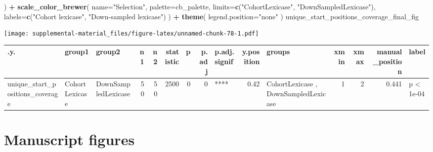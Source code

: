 \documentclass[]{book}
\newenvironment{Shaded}{\begin{snugshade}}{\end{snugshade}}
\newcommand{\DataTypeTok}[1]{\textcolor[rgb]{0.13,0.29,0.53}{#1}}
\newcommand{\KeywordTok}[1]{\textcolor[rgb]{0.13,0.29,0.53}{\textbf{#1}}}
\newcommand{\NormalTok}[1]{#1}
\newcommand{\OperatorTok}[1]{\textcolor[rgb]{0.81,0.36,0.00}{\textbf{#1}}}
\newcommand{\StringTok}[1]{\textcolor[rgb]{0.31,0.60,0.02}{#1}}
\begin{document}
\begin{Shaded}
\begin{Highlighting}[]
\NormalTok{  ) }\OperatorTok{+}
\StringTok{  }\KeywordTok{scale_color_brewer}\NormalTok{(}
    \DataTypeTok{name=}\StringTok{"Selection"}\NormalTok{,}
    \DataTypeTok{palette=}\NormalTok{cb_palette,}
    \DataTypeTok{limits=}\KeywordTok{c}\NormalTok{(}\StringTok{"CohortLexicase"}\NormalTok{, }\StringTok{"DownSampledLexicase"}\NormalTok{),}
    \DataTypeTok{labels=}\KeywordTok{c}\NormalTok{(}\StringTok{"Cohort lexicase"}\NormalTok{, }\StringTok{"Down-sampled lexicase"}\NormalTok{)}
\NormalTok{  ) }\OperatorTok{+}
\StringTok{  }\KeywordTok{theme}\NormalTok{(}
    \DataTypeTok{legend.position=}\StringTok{"none"}
\NormalTok{  )}
\NormalTok{unique_start_positions_coverage_final_fig}
\end{Highlighting}
\end{Shaded}

\texttt{[image: supplemental-material\_files/figure-latex/unnamed-chunk-78-1.pdf]}

\begin{tabular}{l|l|l|r|r|r|r|r|l|r|l|r|r|r|l}
\hline
.y. & group1 & group2 & n1 & n2 & statistic & p & p.adj & p.adj.signif & y.position & groups & xmin & xmax & manual\_position & label\\
\hline
unique\_start\_positions\_coverage & CohortLexicase & DownSampledLexicase & 50 & 50 & 2500 & 0 & 0 & **** & 0.42 & CohortLexicase     , DownSampledLexicase & 1 & 2 & 0.441 & p < 1e-04\\
\hline
\end{tabular}

\hypertarget{manuscript-figures-6}{%
\section{Manuscript figures}\label{manuscript-figures-6}}
\end{document}

